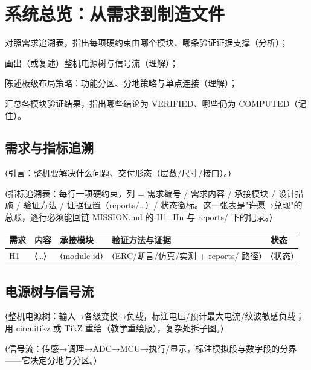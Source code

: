 
\chapter{系统总览：从需求到制造文件}

\begin{introduction}
  \item 对照需求追溯表，指出每项硬约束由哪个模块、哪条验证证据支撑（分析）；
  \item 画出（或复述）整机电源树与信号流（理解）；
  \item 陈述板级布局策略：功能分区、分地策略与单点连接（理解）；
  \item 汇总各模块验证结果，指出哪些结论为 VERIFIED、哪些仍为 COMPUTED（记住）。
\end{introduction}

\section{需求与指标追溯}

⟨引言：整机要解决什么问题、交付形态（层数/尺寸/接口）。⟩

⟨指标追溯表：每行一项硬约束，列 = 需求编号 / 需求内容 / 承接模块 / 设计措施 / 验证方法 / 证据位置（reports/…）/ 状态徽标。这一张表是"许愿→兑现"的总账，逐行必须能回链 MISSION.md 的 H1…Hn 与 reports/ 下的记录。⟩

\begin{center}
\begin{tabular}{@{}lllll@{}}
  \toprule
  需求 & 内容 & 承接模块 & 验证方法与证据 & 状态 \\
  \midrule
  H1 & ⟨…⟩ & ⟨module-id⟩ & ⟨ERC/断言/仿真/实测 + reports/ 路径⟩ & ⟨状态⟩ \\
  \bottomrule
\end{tabular}
\end{center}

\section{电源树与信号流}

⟨整机电源树：输入→各级变换→负载，标注电压/预计最大电流/纹波敏感负载；用 circuitikz 或 TikZ 重绘（教学重绘版），复杂处拆子图。⟩

⟨信号流：传感→调理→ADC→MCU→执行/显示，标注模拟段与数字段的分界——它决定分地与分区。⟩

